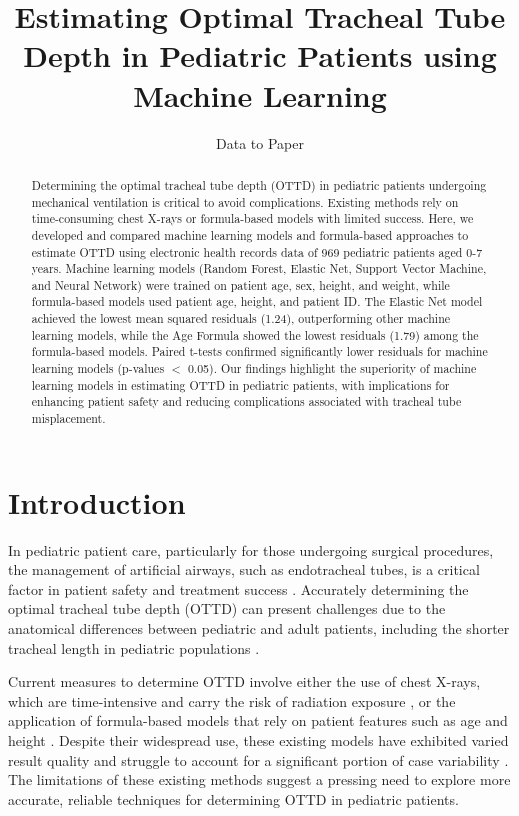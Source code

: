 \documentclass[11pt]{article}
\title{Estimating Optimal Tracheal Tube Depth in Pediatric Patients using Machine Learning}
\author{Data to Paper}
\begin{document}
\maketitle
\begin{abstract}
Determining the optimal tracheal tube depth (OTTD) in pediatric patients undergoing mechanical ventilation is critical to avoid complications. Existing methods rely on time-consuming chest X-rays or formula-based models with limited success. Here, we developed and compared machine learning models and formula-based approaches to estimate OTTD using electronic health records data of 969 pediatric patients aged 0-7 years. Machine learning models (Random Forest, Elastic Net, Support Vector Machine, and Neural Network) were trained on patient age, sex, height, and weight, while formula-based models used patient age, height, and patient ID. The Elastic Net model achieved the lowest mean squared residuals (1.24), outperforming other machine learning models, while the Age Formula showed the lowest residuals (1.79) among the formula-based models. Paired t-tests confirmed significantly lower residuals for machine learning models (p-values $<$ 0.05). Our findings highlight the superiority of machine learning models in estimating OTTD in pediatric patients, with implications for enhancing patient safety and reducing complications associated with tracheal tube misplacement.
\end{abstract}
\section*{Introduction}

In pediatric patient care, particularly for those undergoing surgical procedures, the management of artificial airways, such as endotracheal tubes, is a critical factor in patient safety and treatment success \cite{Kollef1994EndotrachealTM, Cook2005ThePL}. Accurately determining the optimal tracheal tube depth (OTTD) can present challenges due to the anatomical differences between pediatric and adult patients, including the shorter tracheal length in pediatric populations \cite{Kollef1994EndotrachealTM}. 

Current measures to determine OTTD involve either the use of chest X-rays, which are time-intensive and carry the risk of radiation exposure \cite{Mariano2005ACO}, or the application of formula-based models that rely on patient features such as age and height \cite{Mariano2005ACO, Takita2003TheHF}. Despite their widespread use, these existing models have exhibited varied result quality and struggle to account for a significant portion of case variability \cite{Yoo2021DeepLF, Bari2020MachinelearningRA}. The limitations of these existing methods suggest a pressing need to explore more accurate, reliable techniques for determining OTTD in pediatric patients.
\end{document}
